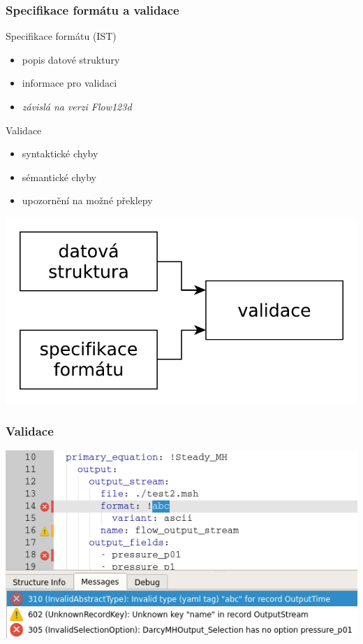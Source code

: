 \begin{frame}[fragile]
	\frametitle{Specifikace formátu a validace}
	\vspace*{-10pt}
	\pause
	\begin{minipage}[t]{0.55\textwidth}
	\begin{block}{Specifikace formátu (IST)}
	\begin{itemize}[<+>]
		\item popis datové struktury
		\item informace pro validaci
		\item \textit{závislá na verzi Flow123d}
	\end{itemize}
	\end{block}
	\begin{block}{Validace\vphantom{y}}
	\begin{itemize}[<+>]
		\item syntaktické chyby
		\item sémantické chyby
		\item upozornění na možné překlepy
	\end{itemize}
	\end{block}
	\end{minipage}
	\hspace*{-10pt}
	\begin{minipage}[t]{0.35\textwidth}
	\vspace{55pt}
	\includegraphics[width=1.4\textwidth]{../../img/validation_process.pdf}\\
	\end{minipage}
\end{frame}

\begin{frame}
	\frametitle{Validace}
	\vspace{15pt}
	\includegraphics[width=\textwidth]{img/validation.png}
\end{frame}

